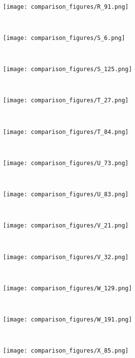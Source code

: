 \documentclass[conference]{IEEEtran}
\begin{document}
\begin{figure*}[!htbp]
    ~
    \begin{subfigure}[b]{0.15\textwidth}
        \texttt{[image: comparison\_figures/R\_91.png]}
    \end{subfigure}
    ~
    \begin{subfigure}[b]{0.15\textwidth}
        \texttt{[image: comparison\_figures/S\_6.png]}
    \end{subfigure}
    ~
    \begin{subfigure}[b]{0.15\textwidth}
        \texttt{[image: comparison\_figures/S\_125.png]}
    \end{subfigure}
    ~
    \begin{subfigure}[b]{0.15\textwidth}
        \texttt{[image: comparison\_figures/T\_27.png]}
    \end{subfigure}
    ~
    \begin{subfigure}[b]{0.15\textwidth}
        \texttt{[image: comparison\_figures/T\_84.png]}
    \end{subfigure}
    ~
    \begin{subfigure}[b]{0.15\textwidth}
        \texttt{[image: comparison\_figures/U\_73.png]}
    \end{subfigure}
    ~
    \begin{subfigure}[b]{0.15\textwidth}
        \texttt{[image: comparison\_figures/U\_83.png]}
    \end{subfigure}
    ~
    \begin{subfigure}[b]{0.15\textwidth}
        \texttt{[image: comparison\_figures/V\_21.png]}
    \end{subfigure}
    ~
    \begin{subfigure}[b]{0.15\textwidth}
        \texttt{[image: comparison\_figures/V\_32.png]}
    \end{subfigure}
    ~
    \begin{subfigure}[b]{0.15\textwidth}
        \texttt{[image: comparison\_figures/W\_129.png]}
    \end{subfigure}
    ~
    \begin{subfigure}[b]{0.15\textwidth}
        \texttt{[image: comparison\_figures/W\_191.png]}
    \end{subfigure}
    ~
    \begin{subfigure}[b]{0.15\textwidth}
        \texttt{[image: comparison\_figures/X\_85.png]}
    \end{subfigure}

\end{figure*}
\end{document}

